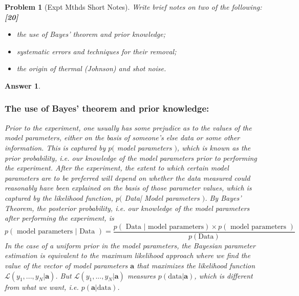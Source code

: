 \documentclass[a4paper]{article}
\newtheorem{ans}{Answer}[subsection]
\theoremstyle{new}
\newtheorem{qns}{Problem}[subsection]
\begin{document}
\newpage
\begin{qns}[Expt Mthds Short Notes]
Write brief notes on two of the following:\hfill\textbf{[20]}
\begin{itemize}
    \item the use of Bayes’ theorem and prior knowledge;
    \item systematic errors and techniques for their removal;
    \item the origin of thermal (Johnson) and shot noise.
\end{itemize}
\end{qns}
\begin{ans}\leavevmode
\subsubsection*{The use of Bayes' theorem and prior knowledge:}
Prior to the experiment, one usually has some prejudice as to the values of the model parameters, either on the basis of someone's else data or some other information. This is captured by $p($ model parameters $)$, which is known as the prior probability, i.e. our knowledge of the model parameters prior to performing the experiment. After the experiment, the extent to which certain model parameters are to be preferred will depend on whether the data measured could reasonably have been explained on the basis of those parameter values, which is captured by the likelihood function, $p($ Data| Model parameters $)$. By Bayes' Theorem, the posterior probability, i.e. our knowledge of the model parameters after performing the experiment, is
$$p(\text{ model parameters | Data })=\frac{p(\text{ Data | model parameters})\times p(\text{ model parameters })}{p(\text{Data})}$$
In the case of a uniform prior in the model parameters, the Bayesian parameter estimation is equivalent to the maximum likelihood approach where we find the value of the vector of model parameters $\mathbf{a}$ that maximizes the likelihood function $\mathcal{L}(y_1,...,y_N|\mathbf{a})$. But $\mathcal{L}(y_1,...,y_N|\mathbf{a})$ measures $p(\text{data}|\mathbf{a})$, which is different from what we want, i.e. $p(\mathbf{a}|\text{data})$. 

\end{ans}
\end{document}
